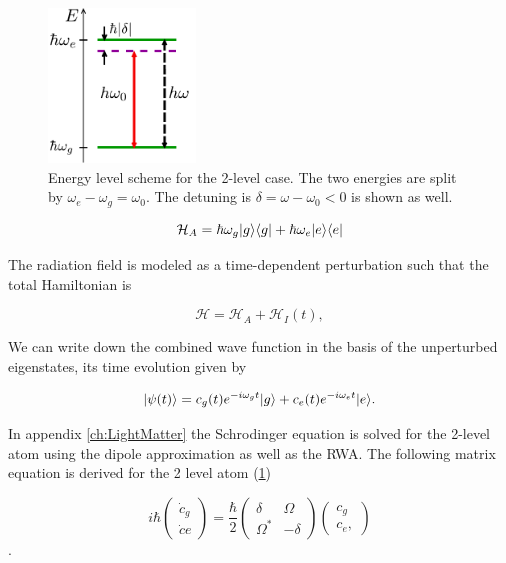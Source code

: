 \begin{figure}
	\centering
	\includegraphics[height=4.1cm]{figures/2LevelAtom.pdf}
	\caption{Energy level scheme for the 2-level case. 
	The two energies are split by $\omega_e - \omega_g = \omega_0$.
	The detuning is $\delta = \omega-\omega_0<0$ is shown as well.}
	\label{fig:2LevelAtom}
\end{figure}

\begin{equation}\label{eq:AtomHamiltonianMain}
	\mathcal{H}_A = \hbar \omega_g \lvert g\rangle\langle g\rvert + \hbar \omega_e \lvert e\rangle\langle e\rvert
\end{equation}

The radiation field is modeled as a time-dependent perturbation such that the total Hamiltonian is \cite{Leeuwen2017}

\begin{equation}\label{eq:PerturbationMain}
	\mathcal{H} = \mathcal{H}_A + \mathcal{H}_{I}(t),
\end{equation}

We can write down the combined wave function in the basis of the unperturbed eigenstates, its time evolution given by

\begin{equation}\label{eq:TwoLevelMain}
	\lvert\psi(t)\rangle = c_g(t) e^{-i \omega_g t} \lvert g\rangle + c_e(t) e^{-i \omega_e t} \lvert e\rangle.
\end{equation}

In appendix \ref{ch:LightMatter} the Schrodinger equation is solved for the 2-level atom using the dipole approximation as well as the \acf*{RWA}. 
The following matrix equation is derived for the 2 level atom (\cref{fig:2LevelAtom}) \cite{Foot2005}

\begin{equation}\label{eq:MatrixEvolution}
	i \hbar \begin{pmatrix}
		\dot{c}_g \\ 
		\dot{c}e
	\end{pmatrix}
	= \frac{\hbar}{2} \begin{pmatrix}
		\delta & \Omega \\ \Omega^* & -\delta 
	\end{pmatrix} 
	\begin{pmatrix}
		c_g \\ c_e,
	\end{pmatrix}
\end{equation}.

